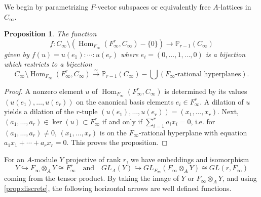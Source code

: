 \documentclass[12pt,a4paper]{article}
\theoremstyle{plain}
\newtheorem{proposition}{Proposition}[section]
\theoremstyle{definition}
\theoremstyle{remark}
\DeclareMathOperator{\Hom}{Hom}
\newcommand{\bP}{\mathbb{P}}
\providecommand{\Hom}{\operatorname{Hom}}
\begin{document}
We begin by parametrizing $F$-vector subspaces or equivalently free $A$-lattices in $C_\infty$.

\begin{proposition}
\label{prop:parametrize}
The function
\[
f: C_\infty \setminus (\Hom_{F_\infty}(F_\infty^r, C_\infty) - \{0\}) \longrightarrow \bP_{r-1}(C_\infty)
\]
given by $f(u) = u(e_1) : \cdots : u(e_r)$ where $e_i = (0, \ldots, 1, \ldots, 0)$ is a bijection which restricts to a bijection
\[
C_\infty \setminus \Hom_{F_\infty}(F_\infty^r, C_\infty) \xrightarrow{\sim} \bP_{r-1}(C_\infty) - \bigcup (F_\infty\text{-rational hyperplanes}).
\]
\end{proposition}

\begin{proof}
A nonzero element $u$ of $\Hom_{F_\infty}(F_\infty^r, C_\infty)$ is determined by its values $(u(e_1), \ldots, u(e_r))$ on the canonical basis elements $e_i \in F_\infty^r$. A dilation of $u$ yields a dilation of the $r$-tuple $(u(e_1), \ldots, u(e_r)) = (x_1, \ldots, x_r)$. Next, $(a_1, \ldots, a_r) \in \ker(u) \subset F_\infty^r$ if and only if $\sum_{i=1}^{r} a_i x_i = 0$, i.e. for $(a_1, \ldots, a_r) \neq 0$, $(x_1, \ldots, x_r)$ is on the $F_\infty$-rational hyperplane with equation $a_1 x_1 + \cdots + a_r x_r = 0$. This proves the proposition.
\end{proof}

For an $A$-module $Y$ projective of rank $r$, we have embeddings and isomorphism
\[
Y \hookrightarrow F_\infty \otimes_A Y \cong F_\infty^r \quad \text{and} \quad GL_A(Y) \hookrightarrow GL_{F_\infty}(F_\infty \otimes_A Y) \cong GL(r, F_\infty)
\]
coming from the tensor product. By taking the image of $Y$ or $F_\infty \otimes_A Y$, and using \eqref{prop:discrete}, the following horizontal arrows are well defined functions.
\end{document}

